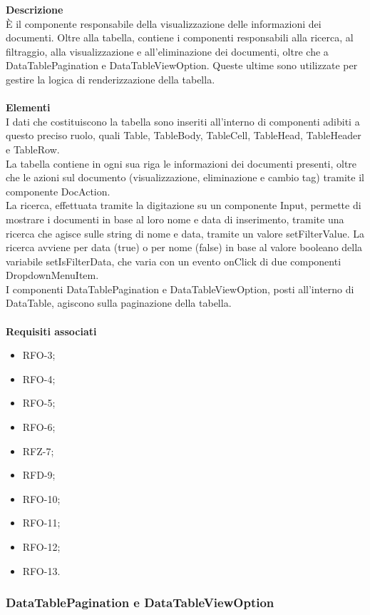 \textbf{Descrizione}\\
È il componente responsabile della visualizzazione delle informazioni dei documenti. Oltre alla tabella, contiene i componenti responsabili alla ricerca, al filtraggio, alla visualizzazione e all'eliminazione dei documenti, oltre che a DataTablePagination e DataTableViewOption. Queste ultime sono utilizzate per gestire la logica di renderizzazione della tabella.\\ \\
\textbf{Elementi}\\
I dati che costituiscono la tabella sono inseriti all'interno di componenti adibiti a questo preciso ruolo, quali Table, TableBody, TableCell, TableHead, TableHeader e TableRow.\\
La tabella contiene in ogni sua riga le informazioni dei documenti presenti, oltre che le azioni sul documento (visualizzazione, eliminazione e cambio tag) tramite il componente DocAction.\\
La ricerca, effettuata tramite la digitazione su un componente Input, permette di mostrare i documenti in base al loro nome e data di inserimento, tramite una ricerca che agisce sulle string di nome e data, tramite un valore setFilterValue. La ricerca avviene per data (true) o per nome (false) in base al valore booleano della variabile setIsFilterData, che varia con un evento onClick di due componenti DropdownMenuItem.\\
I componenti DataTablePagination e DataTableViewOption, posti all'interno di DataTable, agiscono sulla paginazione della tabella.\\ \\
\textbf{Requisiti associati}
\begin{itemize}[itemsep=-4pt]
    \item RFO-3;
    \item RFO-4;
    \item RFO-5;
    \item RFO-6;
    \item RFZ-7;
    \item RFD-9;
    \item RFO-10;
    \item RFO-11;
    \item RFO-12;
    \item RFO-13.
\end{itemize}

\subsubsection{DataTablePagination e DataTableViewOption}


